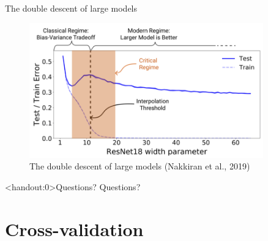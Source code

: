 \documentclass[10pt]{beamer}
\begin{document}
\begin{frame}{The double descent of large models}

\begin{figure}[h]
\caption{The double descent of large models (Nakkiran et al., 2019)}
\centering
\includegraphics[width=0.9\textwidth]{figs/Nakkiran_et_al_2019.png}
\end{figure}



\end{frame}


\begin{frame}<handout:0>{Questions?}
Questions?
\end{frame}


\section{Cross-validation}
\frame{\sectionpage}
\end{document}
